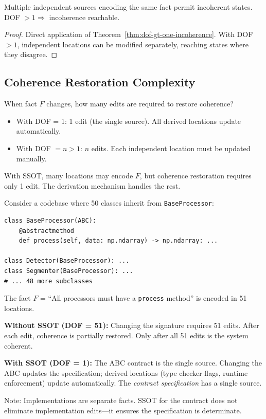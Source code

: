 \begin{corollary}\label{cor:no-redundancy}
Multiple independent sources encoding the same fact permit incoherent states. DOF $> 1 \Rightarrow$ incoherence reachable.
\end{corollary}

\begin{proof}
Direct application of Theorem~\ref{thm:dof-gt-one-incoherence}. With DOF $> 1$, independent locations can be modified separately, reaching states where they disagree.
\end{proof}

\subsection{Coherence Restoration Complexity}\label{sec:ssot-vs-m}

When fact $F$ changes, how many edits are required to restore coherence?

\begin{itemize}
\tightlist
\item With DOF = 1: 1 edit (the single source). All derived locations update automatically.
\item With DOF $= n > 1$: $n$ edits. Each independent location must be updated manually.
\end{itemize}

With SSOT, many locations may encode $F$, but coherence restoration requires only 1 edit. The derivation mechanism handles the rest.

\begin{example}\label{ex:ssot-large-m}
Consider a codebase where 50 classes inherit from \texttt{BaseProcessor}:

\begin{verbatim}
class BaseProcessor(ABC):
    @abstractmethod
    def process(self, data: np.ndarray) -> np.ndarray: ...

class Detector(BaseProcessor): ...
class Segmenter(BaseProcessor): ...
# ... 48 more subclasses
\end{verbatim}

The fact $F$ = ``All processors must have a \texttt{process} method'' is encoded in 51 locations.

\textbf{Without SSOT (DOF = 51):} Changing the signature requires 51 edits. After each edit, coherence is partially restored. Only after all 51 edits is the system coherent.

\textbf{With SSOT (DOF = 1):} The ABC contract is the single source. Changing the ABC updates the specification; derived locations (type checker flags, runtime enforcement) update automatically. The \emph{contract specification} has a single source.

Note: Implementations are separate facts. SSOT for the contract does not eliminate implementation edits---it ensures the specification is determinate.
\end{example}

